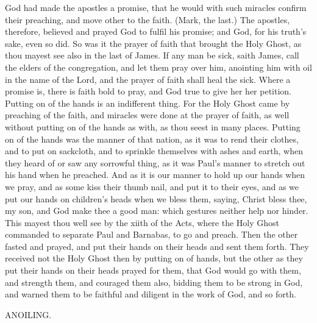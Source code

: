 God had made the apostles a promise, that he would 
with such miracles confirm their preaching, and move 
other to the faith. (Mark, the last.) The apostles, therefore,
believed and prayed God to fulfil his promise; and 
God, for his truth's sake, even so did. So was it the 
prayer of faith that brought the Holy Ghost, as thou 
mayest see also in the last of James. If any man be sick, 
saith James, call the elders of the congregation, and let 
them pray over him, anointing him with oil in the name 
of the Lord, and the prayer of faith shall heal the sick. 
Where a promise is, there is faith bold to pray, and God 
true to give her her petition. Putting on of the hands is 
an indifferent thing. For the Holy Ghost came by 
preaching of the faith, and miracles were done at the 
prayer of faith, as well without putting on of the hands 
as with, as thou seest in many places. Putting on of the 
hands was the manner of that nation, as it was to rend 
their clothes, and to put on sackcloth, and to sprinkle 
themselves with ashes and earth, when they heard of or 
saw any sorrowful thing, as it was Paul's manner to 
stretch out his hand when he preached. And as it 
is our manner to hold up our hands when we pray, and 
as some kiss their thumb nail, and put it to their eyes, 
and as we put our hands on children's heads when we 
bless them, saying, Christ bless thee, my son, and God 
make thee a good man: which gestures neither help nor 
hinder. This mayest thou well see by the xiith of the 
Acts, where the Holy Ghost commanded to separate 
Paul and Barnabas, to go and preach. Then the other 
fasted and prayed, and put their hands on their heads and 
sent them forth. They received not the Holy Ghost 
then by putting on of hands, but the other as they put 
their hands on their heads prayed for them, that God 
would go with them, and strength them, and couraged 
them also, bidding them to be strong in God, and 
warned them to be faithful and diligent in the work of 
God, and so forth. 


ANOILING. 

